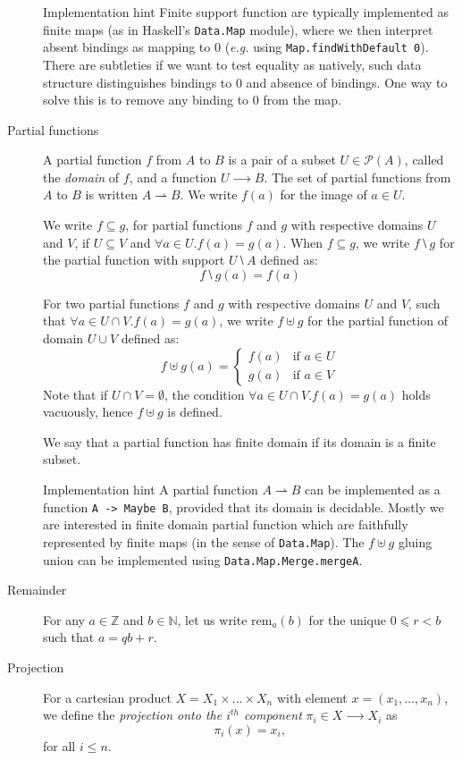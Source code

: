 \documentclass{article}
\newenvironment{implementationhint}{\begin{bclogo}[noborder=true,
    logo=\bccrayon, epBarre=3, couleurBarre=PineGreen]{Implementation hint}}{\end{bclogo}}
\newcommand{\powerset}[1]{\mathcal{P}(#1)}
\newcommand{\rem}[2]{\mathrm{rem}_{#1}(#2)}
\begin{document}
\begin{description}
  \begin{implementationhint}
    Finite support function are typically implemented as finite maps
    (as in Haskell's \verb+Data.Map+ module), where we then interpret
    absent bindings as mapping to $0$ (\emph{e.g.} using
    \verb+Map.findWithDefault 0+). There are subtleties if we want to
    test equality as natively, such data structure distinguishes
    bindings to $0$ and absence of bindings. One way to solve this is
    to remove any binding to $0$ from the map.
  \end{implementationhint}

\item[Partial functions] A partial function $f$ from $A$ to $B$ is a
  pair of a subset $U∈\powerset{A}$, called the \emph{domain} of $f$,
  and a function $U⟶B$. The set of partial functions from $A$ to $B$
  is written $A ⇀ B$. We write $f(a)$ for the image of $a∈U$.

  We write $f⊆g$, for partial functions $f$ and $g$ with respective domains $U$
  and $V$, if $U ⊆ V$ and $∀a∈U. f(a)=g(a)$. When $f⊆g$, we write
  $f⧵g$ for the partial function with support $U⧵A $ defined as:
  $$
  f⧵g(a) = f(a)
  $$

  For two partial functions $f$ and $g$ with respective domains $U$
  and $V$, such that $∀a∈U∩V. f(a)=g(a)$, we write $f⊎g$ for the partial function
  of domain $U∪V$ defined as:
  $$
  f⊎g(a) = \left\{
    \begin{array}{ll}
      f(a) & \mbox{if }a∈U\\
      g(a) & \mbox{if }a∈V
    \end{array}
    \right.
  $$
  Note that if $U∩V=∅$, the condition $∀a∈U∩V. f(a)=g(a)$ holds
  vacuously, hence $f⊎g$ is defined.

  We say that a partial function has finite domain if its domain is
  a finite subset.

  \begin{implementationhint}
    A partial function $A⇀B$ can be implemented as a function
    \verb+A -> Maybe B+, provided that its domain is decidable. Mostly we are
    interested in finite domain partial function which are faithfully
    represented by finite maps (in the sense of \verb+Data.Map+). The $f⊎g$
    gluing union can be implemented using \verb+Data.Map.Merge.mergeA+.
  \end{implementationhint}


\item[Remainder] For any $a∈ℤ$ and $b∈ℕ$, let us write $\rem{a}{b}$
  for the unique $0⩽r<b$ such that $a=qb+r$.

\item[Projection] For a cartesian product $X=X_1×…× X_n$ with element $x =
  (x_1, \dots, x_n)$, we define the \textit{projection onto the $i^{th}$ component}
  $\pi_i∈X⟶X_i$ as \[\pi_i(x)=x_i,\] for all $i \leq n$.
\end{description}
\end{document}
